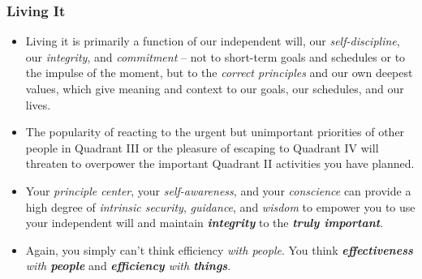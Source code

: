 \documentclass[11pt]{article}
\begin{document}
\subsubsection{Living It}
\begin{itemize}
\item Living it is primarily a function of our independent will, our \emph{self-discipline}, our \emph{integrity}, and \emph{commitment} -- not to short-term goals and schedules or to the impulse of the moment, but to the \emph{correct principles} and our own deepest values, which give meaning and context to our goals, our schedules, and our lives.

\item The popularity of reacting to the urgent but unimportant priorities of other people in Quadrant III or the pleasure of escaping to Quadrant IV will threaten to overpower the important Quadrant II activities you have planned. 

\item Your \emph{principle center}, your \emph{self-awareness}, and your \emph{conscience} can provide a high degree of \emph{intrinsic security}, \emph{guidance}, and \emph{wisdom} to empower you to use your independent will and maintain \emph{\textbf{integrity}} to the \emph{\textbf{truly important}}.

\item Again, you simply can't think efficiency \emph{with people}. You think \emph{\textbf{effectiveness} with \textbf{people}} and \emph{\textbf{efficiency} with \textbf{things}}.
\end{itemize}
\end{document}
